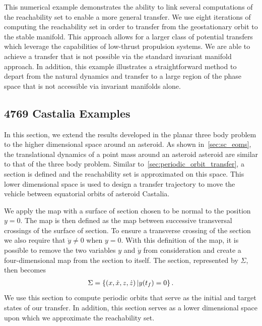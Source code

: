 This numerical example demonstrates the ability to link several computations of the reachability set to enable a more general transfer.
We use eight iterations of computing the reachability set in order to transfer from the geostationary orbit to the stable manifold.
This approach allows for a larger class of potential transfers which leverage the capabilities of low-thrust propulsion systems.
We are able to achieve a transfer that is not possible via the standard invariant manifold approach. 
In addition, this example illustrates a straightforward method to depart from the natural dynamics and transfer to a large region of the phase space that is not accessible via invariant manifolds alone.
\subsection{4769 Castalia Examples}\label{sec:castalia_transfer}
In this section, we extend the results developed in the planar three body problem to the higher dimensional space around an asteroid.
As shown in~\cref{sec:sc_eoms}, the translational dynamics of a point mass around an asteroid asteroid are similar to that of the three body problem.
Similar to~\cref{sec:periodic_orbit_transfer}, a \Poincare section is defined and the reachability set is approximated on this space. 
This lower dimensional space is used to design a transfer trajectory to move the vehicle between equatorial orbits of asteroid Castalia.

We apply the \Poincare map with a surface of section chosen to be normal to the position \( y = 0 \).
The \Poincare map is then defined as the map between successive transversal crossings of the surface of section.
To ensure a transverse crossing of the section we also require that \( \dot{y} \neq 0 \) when \( y = 0 \).
With this definition of the \Poincare map, it is possible to remove the two variables \( y \) and \( \dot{y} \) from consideration and create a four-dimensional map from the \Poincare section to itself.
The \Poincare section, represented by \( \Sigma \), then becomes
\begin{align}\label{eq:poincare_section}
    \Sigma = \left\{ \left( x, \dot{x}, z, \dot{z} \right) | y(t_f) = 0  \right\}.
\end{align}
We use this section to compute periodic orbits that serve as the initial and target states of our transfer.
In addition, this section serves as a lower dimensional space upon which we approximate the reachability set.

